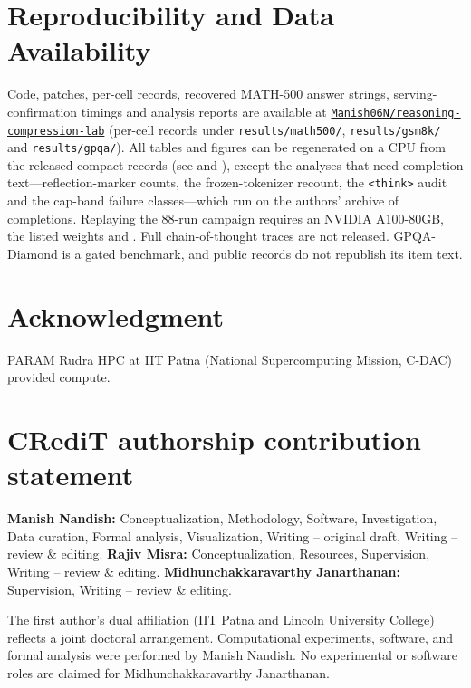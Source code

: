 \documentclass[11pt,a4paper]{article}
\begin{document}
\section*{Reproducibility and Data Availability}
Code, patches, per-cell records, recovered MATH-500 answer strings, serving-confirmation timings and analysis reports are available at \href{https://github.com/Manish06N/reasoning-compression-lab}{\nolinkurl{Manish06N/reasoning-compression-lab}} (per-cell records under \texttt{results/math500/}, \texttt{results/gsm8k/} and \texttt{results/gpqa/}). All tables and figures can be regenerated on a CPU from the released compact records (see  and ), except the analyses that need completion text---reflection-marker counts, the frozen-tokenizer recount, the \texttt{<think>} audit and the cap-band failure classes---which run on the authors' archive of completions. Replaying the 88-run campaign requires an NVIDIA A100-80GB, the listed weights and . Full chain-of-thought traces are not released. GPQA-Diamond is a gated benchmark, and public records do not republish its item text.


\section*{Acknowledgment}
PARAM Rudra HPC at IIT Patna (National Supercomputing Mission, C-DAC) provided compute.

\section*{CRediT authorship contribution statement}
\textbf{Manish Nandish:} Conceptualization, Methodology, Software, Investigation, Data curation, Formal analysis, Visualization, Writing -- original draft, Writing -- review \& editing.
\textbf{Rajiv Misra:} Conceptualization, Resources, Supervision, Writing -- review \& editing.
\textbf{Midhunchakkaravarthy Janarthanan:} Supervision, Writing -- review \& editing.

The first author's dual affiliation (IIT Patna and Lincoln University College) reflects a joint doctoral arrangement. Computational experiments, software, and formal analysis were performed by Manish Nandish. No experimental or software roles are claimed for Midhunchakkaravarthy Janarthanan.
\end{document}

